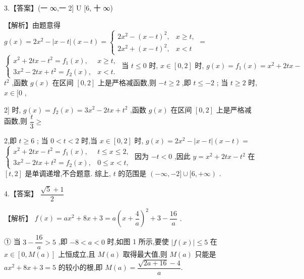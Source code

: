 \documentclass[10pt]{article}
\begin{document}
3.【答案】(一 ∞,一 2] U [6, 十 ∞)

【解析】由题意得 $g\left( x\right)  = 2{x}^{2} - \left| {x - t}\right| \left( {x - t}\right)  = \left\{  {\begin{array}{ll} 2{x}^{2} - {\left( x - t\right) }^{2}, & x \geq  t, \\  2{x}^{2} + {\left( x - t\right) }^{2}, & x < t \end{array} = }\right.$  $\left\{  {\begin{array}{ll} {x}^{2} + {2tx} - {t}^{2} = {f}_{1}\left( x\right) , & x \geq  t, \\  3{x}^{2} - {2tx} + {t}^{2} = {f}_{2}\left( x\right) , & x < t. \end{array}\text{ 当 }t \leq  0\text{ 时, }x \in  \left\lbrack  {0,2}\right\rbrack  \text{ 时, }g\left( x\right)  = {f}_{1}\left( x\right)  = {x}^{2} + {2tx} - }\right.$  ${t}^{2}$ ,函数 $g\left( x\right)$ 在区间 $\left\lbrack  {0,2}\right\rbrack$ 上是严格减函数,则 $- t \geq  2$ ,即 $t \leq   - 2$ ; 当 $t \geq  2$ 时, $x \in  \lbrack 0$ ,

2] 时, $g\left( x\right)  = {f}_{2}\left( x\right)  = 3{x}^{2} - {2tx} + {t}^{2}$ ,函数 $g\left( x\right)$ 在区间 $\left\lbrack  {0,2}\right\rbrack$ 上是严格减函数,则 $\dfrac{t}{3} \geq$

2,即 $t \geq  6$ ; 当 $0 < t < 2$ 时,当 $x \in  \left\lbrack  {0,2}\right\rbrack$ 时, $g\left( x\right)  = 2{x}^{2} - \left| {x - t}\right| \left( {x - t}\right)  =$  $\left\{  \begin{array}{ll} {x}^{2} + {2tx} - {t}^{2} = {f}_{1}\left( x\right) , & t \leq  x \leq  2, \\  3{x}^{2} - {2tx} + {t}^{2} = {f}_{2}\left( x\right) , & 0 \leq  x < t, \end{array}\right.$ 因为 $- t < 0$ ,因此 $y = {x}^{2} + {2tx} - {t}^{2}$ 在 $\left\lbrack  {t,2}\right\rbrack$ 是单调递增,不合题意. 综上, $t$ 的范围是 $\left( {-\infty , - 2\rbrack \cup \lbrack 6, + \infty }\right)$ .

4.【答案】 $\dfrac{\sqrt{5} + 1}{2}$

【解析】 $f\left( x\right)  = a{x}^{2} + {8x} + 3 = a{\left( x + \dfrac{4}{a}\right) }^{2} + 3 - \dfrac{16}{a}$ .

① 当 $3 - \dfrac{16}{a} > 5$ ,即 $- 8 < a < 0$ 时,如图 1 所示,要使 $\left| {f\left( x\right) }\right|  \leq  5$ 在 $x \in  \left\lbrack  {0,M\left( a\right) }\right\rbrack$ 上恒成立,且 $M\left( a\right)$ 取得最大值,则 $M\left( a\right)$ 只能是 $a{x}^{2} + {8x} + 3 = 5$ 的较小的根,即 $M\left( a\right)  = \dfrac{\sqrt{{2a} + {16}} - 4}{a}.$
\end{document}
